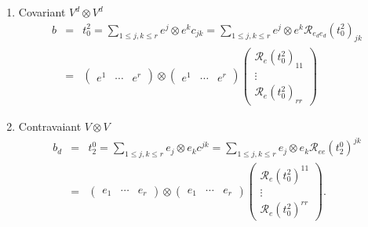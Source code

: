 \documentclass[aps,preprint]{revtex4}
\begin{document}
\begin{enumerate}
\item Covariant $V^{d}\otimes V^{d}$ \label{V^dXV^d} 
\begin{eqnarray}
b &=&t_{0}^{2}=\sum_{1\leq j,k\leq r}e^{j}\otimes e^{k}c_{jk}=\sum_{1\leq
j,k\leq r}e^{j}\otimes e^{k}\mathcal{R}_{e_{d}e_{d}}\left( t_{0}^{2}\right)
_{jk} \\
&=&\left( 
\begin{array}{ccc}
e^{1} & \cdots & e^{r}%
\end{array}%
\right) \otimes \left( 
\begin{array}{ccc}
e^{1} & \cdots & e^{r}%
\end{array}%
\right) \left( 
\begin{array}{c}
\mathcal{R}_{e}\left( t_{0}^{2}\right) _{11} \\ 
\vdots \\ 
\mathcal{R}_{e}\left( t_{0}^{2}\right) _{rr}%
\end{array}%
\right)
\end{eqnarray}

\item Contravaiant $V\otimes V$ \label{VXV} 
\begin{eqnarray}
b_{d} &=&t_{2}^{0}=\sum_{1\leq j,k\leq r}e_{j}\otimes
e_{k}c^{jk}=\sum_{1\leq j,k\leq r}e_{j}\otimes e_{k}\mathcal{R}_{ee}\left(
t_{2}^{0}\right) ^{jk} \\
&=&\left( 
\begin{array}{ccc}
e_{1} & \cdots & e_{r}%
\end{array}%
\right) \otimes \left( 
\begin{array}{ccc}
e_{1} & \cdots & e_{r}%
\end{array}%
\right) \left( 
\begin{array}{c}
\mathcal{R}_{e}\left( t_{0}^{2}\right) ^{11} \\ 
\vdots \\ 
\mathcal{R}_{e}\left( t_{0}^{2}\right) ^{rr}%
\end{array}%
\right) .
\end{eqnarray}


\end{enumerate}
\end{document}
